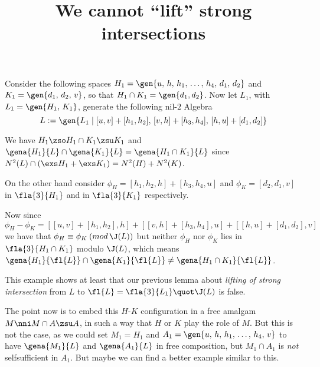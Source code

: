 \documentclass[a4paper,11pt,german,english]{article}
\title{We cannot ``lift'' strong intersections}
\begin{document}
\maketitle
Consider the following spaces
$H_{1}=\gen{u,\,h,\,h_{1},\,\dots,\,h_{4},\,d_{1},\,d_{2}}$ %
and
$K_{1}=\gen{d_{1},\,d_{2},\,v}$, so that  $H_{1}\cap K_{1}=\gen{d_{1},d_{2}}$. %
Now let $L_{1}$, with $L_{1}=\gen{H_{1},\, K_{1}}$, generate the following nil-$2$ Algebra
$$L:=\gen{L_{1}\mid [u,v]+[h_{1},h_{2}],\,[v,h]+[h_{3},h_{4}],\,[h,u]+[d_{1},d_{2}]}$$

\smallskip
We have $H_{1}\zso H_{1}\cap K_{1}\zsu K_{1}$ and $\gena{H_{1}}{L}\cap\gena{K_{1}}{L}=\gena{H_{1}\cap K_{1}}{L}$ since
$N^{2}(L)\cap(\exs H_{1}+\exs K_{1})=N^{2}(H)+N^{2}(K)$.

\smallskip
On the other hand consider $\phi_{H}=[h_{1},h_{2},h]+[h_{3},h_{4},u]$
and $\phi_{K}=[d_{2},d_{1},v]$ in $\fla{3}{H_{1}}$ and in $\fla{3}{K_{1}}$ respectively.

Now since
$$
\phi_{H}-\phi_{K}=[[u,v]+[h_{1},h_{2}],h] + [[v,h]+[h_{3},h_{4}],u] + [[h,u]+[d_{1},d_{2}],v]
$$
we have that $\phi_{H}\equiv\phi_{K}\:(mod\,\J(L))$ but neither $\phi_{H}$ nor $\phi_{K}$ lies
in $\fla{3}{H_{1}\cap K_{1}}$ modulo $\J(L)$, which means
$\gena{H_{1}}{\fl{L}}\cap\gena{K_{1}}{\fl{L}}\neq\gena{H_{1}\cap K_{1}}{\fl{L}}$.

This example shows at least that our previous lemma about {\em lifting of
strong intersection} from $L$ to $\fl{L}=\fla{3}{L_{1}}\quot\J(L)$ is false.

\medskip
The point now is to embed this $H$-$K$ configuration in a free amalgam $M\nni M\cap A\zsu A$, in such a way that $H$ or $K$ play the role of $M$. But this is not the case, as we could
set $M_{1}=H_{1}$ and $A_{1}=\gen{u,\,h,\,h_{1},\,\dots,\,h_{4},\,v}$ to have
$\gena{M_{1}}{L}$ and $\gena{A_{1}}{L}$ in free composition, but $M_{1}\cap A_{1}$ is {\em not}
selfsufficient in $A_{1}$. But maybe we can find a better example similar to this. 
\end{document}
